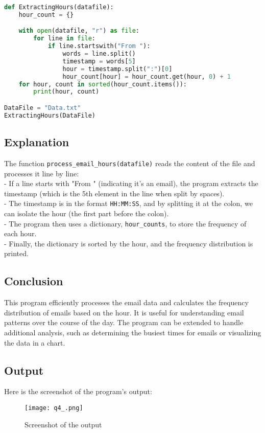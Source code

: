 \documentclass{article}
\begin{document}
\begin{lstlisting}[language=Python]
def ExtractingHours(datafile):
    hour_count = {}

    with open(datafile, "r") as file:
        for line in file:
            if line.startswith("From "):  
                words = line.split()  
                timestamp = words[5]  
                hour = timestamp.split(":")[0] 
                hour_count[hour] = hour_count.get(hour, 0) + 1
    for hour, count in sorted(hour_count.items()):
        print(hour, count)

DataFile = "Data.txt"
ExtractingHours(DataFile)
\end{lstlisting}

\subsection{Explanation}
The function \texttt{process\_email\_hours(datafile)} reads the content of the file and processes it line by line:\\
- If a line starts with "From " (indicating it's an email), the program extracts the timestamp (which is the 5th element in the line when split by spaces).\\
- The timestamp is in the format \texttt{HH:MM:SS}, and by splitting it at the colon, we can isolate the hour (the first part before the colon).\\
- The program then uses a dictionary, \texttt{hour\_counts}, to store the frequency of each hour.\\
- Finally, the dictionary is sorted by the hour, and the frequency distribution is printed.\\
\subsection{Conclusion}
This program efficiently processes the email data and calculates the frequency distribution of emails based on the hour. It is useful for understanding email patterns over the course of the day. The program can be extended to handle additional analysis, such as determining the busiest times for emails or visualizing the data in a chart.
\subsection{Output}
Here is the screenshot of the program's output:
\begin{figure}[h!]
    \centering
    \texttt{[image: q4\_.png]} 
    \caption{Screenshot of the output}
\end{figure}
\end{document}
